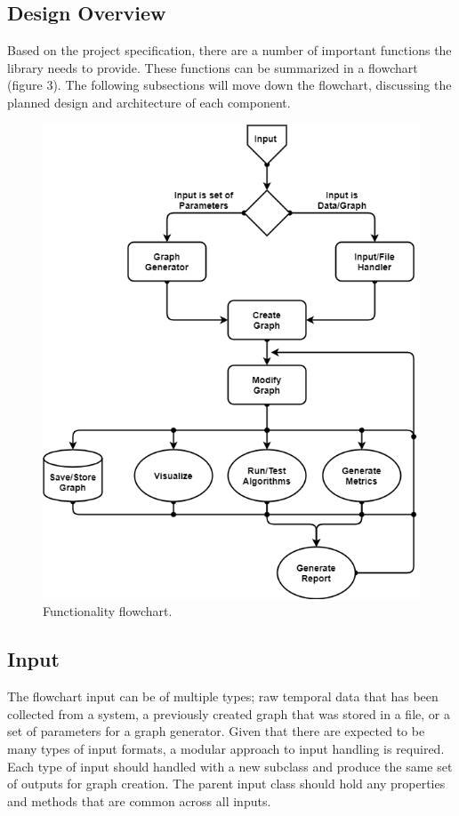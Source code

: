 \begin{design}
\section{Design Overview}
Based on the project specification, there are a number of important functions the library needs to provide. These functions can be summarized in a flowchart (figure 3). The following subsections will move down the flowchart, discussing the planned design and architecture of each component.
\begin{figure}[h]
    \centering
    \includegraphics[scale=0.58]{images/flowchart.png}
    \caption{Functionality flowchart.}
\end{figure}
\subsection{Input}
The flowchart input can be of multiple types; raw temporal data that has been collected from a system, a previously created graph that was stored in a file, or a set of parameters for a graph generator. Given that there are expected to be many types of input formats, a modular approach to input handling is required. Each type of input should handled with a new subclass and produce the same set of outputs for graph creation. The parent input class should hold any properties and methods that are common across all inputs.

\end{design}
